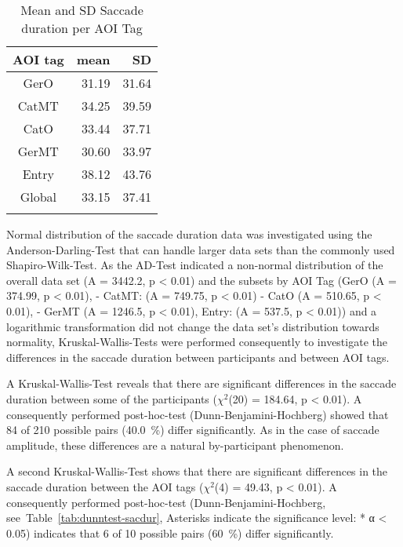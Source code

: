 \documentclass[output=paper,colorlinks,citecolor=brown]{langscibook}
\begin{document}
\begin{table}
\caption{Mean and SD Saccade duration per AOI Tag}
\label{tab:sacdur}
 \begin{tabular}{crr}
  \lsptoprule
             AOI tag & mean & SD \\ 
  \midrule
  GerO  & 31.19 & 31.64 \\
  CatMT  & 34.25 & 39.59\\
  CatO   & 33.44 & 37.71\\
  GerMT  & 30.60 & 33.97\\
  Entry  & 38.12 & 43.76\\
  Global & 33.15 & 37.41\\
  \lspbottomrule
 \end{tabular}
\end{table}


Normal distribution of the saccade duration data was investigated using the Anderson-Darling-Test that can handle larger data sets than the commonly used Shapiro-Wilk-Test. As the AD-Test indicated a non-normal distribution of the overall data set (A = 3442.2, p < 0.01) and the subsets by AOI Tag (GerO (A = 374.99, p < 0.01), - CatMT: (A = 749.75, p < 0.01) - CatO (A = 510.65, p < 0.01), - GerMT (A = 1246.5, p < 0.01), Entry: (A = 537.5, p < 0.01)) and a logarithmic transformation did not change the data set's distribution towards normality, Kruskal-Wallis-Tests were performed consequently to investigate the differences in the saccade duration between participants and between AOI tags.

A Kruskal-Wallis-Test reveals that there are significant differences in the saccade duration between some of the participants ($\chi^2$(20) = 184.64, p < 0.01). A consequently performed post-hoc-test (Dunn-Benjamini-Hochberg) showed that 84 of 210 possible pairs (40.0~\%) differ significantly. As in the case of saccade amplitude, these differences are a natural by-participant phenomenon.

A second Kruskal-Wallis-Test shows that there are significant differences in the saccade duration between the AOI tags ($\chi^2$(4) = 49.43, p < 0.01). A consequently performed post-hoc-test (Dunn-Benjamini-Hochberg, see~Table~\ref{tab:dunntest-sacdur}, Asterisks indicate the significance level: * α < 0.05) indicates that 6 of 10 possible pairs (60~\%) differ significantly.
\end{document}
